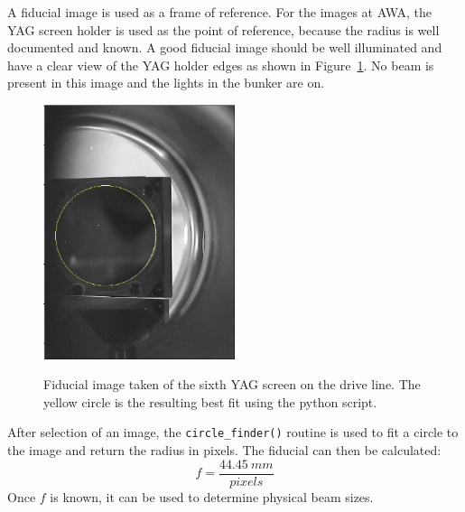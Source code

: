 A fiducial image is used as a frame of reference. 
For the images at AWA, the YAG screen holder is used 
as the point of reference, because the radius is well documented and known.
A good fiducial image should be well illuminated and have a clear view of the YAG holder 
edges as shown in Figure~\ref{fig:fiducial}.
No beam is present in this image and the lights in the bunker are on.
\begin{figure}
	\centering
	\includegraphics[width=0.5\textwidth]{images/YAG6_kicker_fiducial}
	\label{fig:fiducial}
	\caption{Fiducial image taken of the sixth YAG screen on the drive line.
	The yellow circle is the resulting best fit using the python script. }
\end{figure}
After selection of an image, the \verb|circle_finder()| routine is used 
to fit a circle to the image and return the radius in pixels.
The fiducial can then be calculated:
\begin{equation}
	f = \frac{\SI{44.45}{mm}}{pixels} 
\end{equation}
Once $f$ is known, it can be used to determine physical beam sizes.


